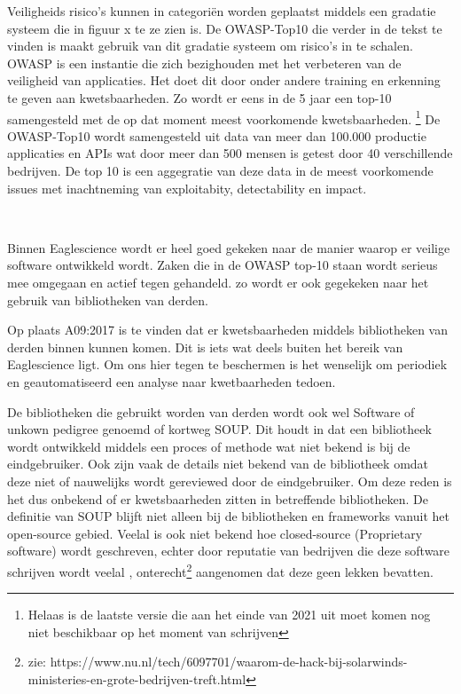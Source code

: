 Veiligheids risico's kunnen in categoriën worden geplaatst middels een gradatie systeem die in figuur x te ze zien is.
De OWASP-Top10 die verder in de tekst te vinden is maakt gebruik van dit gradatie systeem om risico's in te schalen.
OWASP is een instantie die zich bezighouden met het verbeteren van de veiligheid van applicaties.
Het doet dit door onder andere training en erkenning te geven aan kwetsbaarheden.
Zo wordt er eens in de 5 jaar een top-10 samengesteld met de op dat moment meest voorkomende kwetsbaarheden.
\footnote{Helaas is de laatste versie die aan het einde van 2021 uit moet komen nog niet beschikbaar op het moment van schrijven}
De OWASP-Top10 wordt samengesteld uit data van meer dan 100.000 productie applicaties en APIs wat door meer dan 500 mensen is getest door 40 verschillende bedrijven.
De top 10 is een aggegratie van deze data in de meest voorkomende issues met inachtneming van exploitabity, detectability en impact.








\

Binnen Eaglescience wordt er heel goed gekeken naar de manier waarop er veilige software ontwikkeld wordt.
Zaken die in de OWASP top-10 staan wordt serieus mee omgegaan en actief tegen gehandeld. zo wordt er ook gegekeken naar het gebruik van bibliotheken van derden.

Op plaats A09:2017 is te vinden dat er kwetsbaarheden middels bibliotheken van derden binnen kunnen komen. Dit is iets wat deels buiten het bereik van Eaglescience ligt. Om ons hier tegen te beschermen is het wenselijk om periodiek en geautomatiseerd een analyse naar kwetbaarheden tedoen.

De bibliotheken die gebruikt worden van derden wordt ook wel Software of unkown pedigree genoemd of kortweg SOUP. Dit houdt in dat een bibliotheek wordt ontwikkeld middels een proces of methode wat niet bekend is bij de eindgebruiker. Ook zijn vaak de details niet bekend van de bibliotheek omdat deze niet of nauwelijks wordt gereviewed door de eindgebruiker. Om deze reden is het dus onbekend of er kwetsbaarheden zitten in betreffende bibliotheken.
De definitie van SOUP blijft niet alleen bij de bibliotheken en frameworks vanuit het open-source gebied. Veelal is ook niet bekend hoe closed-source (Proprietary software) wordt geschreven, echter door reputatie van bedrijven die deze software schrijven wordt veelal , onterecht\footnote{zie: https://www.nu.nl/tech/6097701/waarom-de-hack-bij-solarwinds-ministeries-en-grote-bedrijven-treft.html } aangenomen dat deze geen lekken bevatten.

